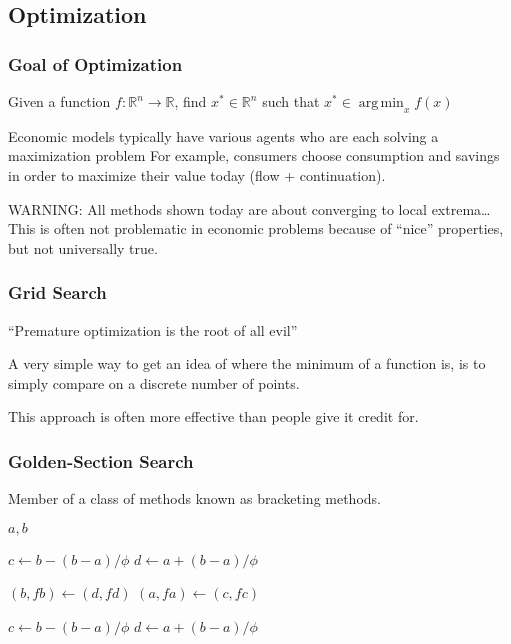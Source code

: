\documentclass[10pt]{beamer}
\DeclareMathOperator*{\argmin}{arg\,min}
\begin{document}
\subsection{Optimization}

\begin{frame} \frametitle{Goal of Optimization}

  Given a function $f: \mathbb{R}^n \rightarrow \mathbb{R}$, find $x^* \in \mathbb{R}^n$ such that $x^* \in \argmin_x f(x)$

  \vspace{0.3cm}

  Economic models typically have various agents who are each solving a maximization problem \textemdash{} For example, consumers choose consumption and savings in order to maximize their value today (flow + continuation).

  \vspace{0.3cm}

  {\color{red} WARNING: All methods shown today are about converging to local extrema\dots This is often not problematic in economic problems because of ``nice'' properties, but not universally true.}

\end{frame}

\begin{frame} \frametitle{Grid Search}
  ``Premature optimization is the root of all evil'' 

  \vspace{0.5cm}

  A very simple way to get an idea of where the minimum of a function is, is to simply compare on a discrete number of points.

  \vspace{0.5cm}

  This approach is often more effective than people give it credit for.

\end{frame}

\begin{frame} \frametitle{Golden-Section Search}

  Member of a class of methods known as bracketing methods.

  \vspace{0.5cm}

  \begin{algorithmic}

    \REQUIRE $a, b$

    \STATE $c \leftarrow b - (b-a)/\phi$
    \STATE $d \leftarrow a + (b-a)/\phi$


      \STATE $(b, fb) \leftarrow (d, fd)$
    \ELSE
      \STATE $(a, fa) \leftarrow (c, fc)$
    \ENDIF

    \STATE $c \leftarrow b - (b-a)/\phi$
    \STATE $d \leftarrow a + (b-a)/\phi$

    \ENDWHILE

  \end{algorithmic}

\end{frame}
\end{document}
